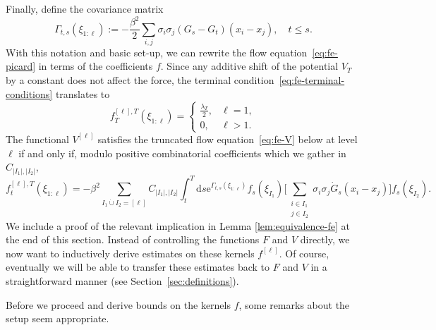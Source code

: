 \documentclass[11pt, a4paper]{scrartcl}
\numberwithin{equation}{section}
\theoremstyle{plain}
\theoremstyle{remark}
\newcommand{\assign}{:=}
\newcommand{\mathd}{\mathrm{d}}
\newcommand{\mathe}{\mathrm{e}}
\begin{document}
Finally, define the covariance matrix
\begin{equation}
  \Gamma_{t, s} (\xi_{1 : \ell}) \assign - \frac{\beta^2}{2}  \sum_{i, j} \sigma_i
  \sigma_j (G_s - G_t) (x_i - x_j), \quad t \leqslant s. \label{eq:def-W}
\end{equation}
With this notation and basic set-up, we can rewrite the flow
equation~\eqref{eq:fe-picard} in terms of the coefficients $f$. Since any
additive shift of the potential $V_T$ by a constant does not affect the force,
the terminal condition~\eqref{eq:fe-terminal-conditions} translates to
\begin{equation}
  f_T^{[\ell], T} (\xi_{1 : \ell}) = \begin{cases}
    \frac{\lambda_T}{2}, & \ell = 1,\\
    0, & \ell > 1.
  \end{cases} \label{eq:ic-fe}
\end{equation}
The functional $V^{[\ell]}$ satisfies
the truncated flow equation~\eqref{eq:fe-V} below at level $\ell$ if and only
if, modulo positive combinatorial coefficients which we gather in $C_{ | I_1 |,
| I_2 |}$,
\begin{equation}
  f_t^{[\ell], T} (\xi_{1 : \ell}) = - \beta^2 \sum_{I_1 \dot{\cup} I_2 = [\ell]} C_{ | I_1 |,
  | I_2 |} \int_t^T \mathd s \mathe^{\Gamma_{t, s} (\xi_{1 : \ell})} f_s
  (\xi_{I_1}) \Big[ \sum_{\substack{{i \in I_1}\\{j \in I_2}}} \sigma_i \sigma_j 
  \dot{G}_s (x_i - x_j) \Big] f_s  (\xi_{I_2}) . \label{eq:fe-v-coeffients}
\end{equation}
We include a proof of the relevant implication in Lemma 
\ref{lem:equivalence-fe} at the end of this section.
Instead of controlling the functions $F$ and $V$ directly, we now want to
inductively derive estimates on these kernels $f^{[\ell]}$. Of course,
eventually we will be able to transfer these estimates back to $F$ and $V$ in
a straightforward manner (see Section~\ref{sec:definitions}).

Before we proceed and derive bounds on the kernels $f$, some remarks about the
setup seem appropriate.
\end{document}

